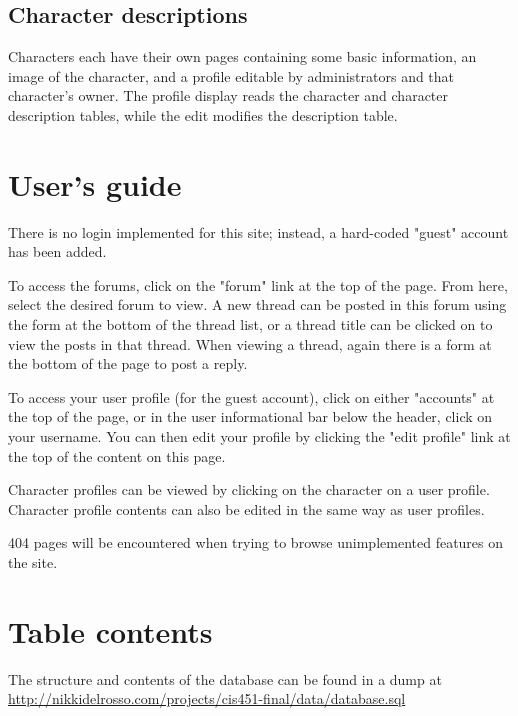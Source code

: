 \documentclass{book}
\begin{document}
\subsection{Character descriptions}
Characters each have their own pages containing some basic information, an image of the character, and a profile editable by administrators and that character's owner.  The profile display reads the character and character description tables, while the edit modifies the description table.


\newpage
\section{User's guide}
There is no login implemented for this site; instead, a hard-coded "guest" account has been added.

To access the forums, click on the "forum" link at the top of the page.  From here, select the desired forum to view.  A new thread can be posted in this forum using the form at the bottom of the thread list, or a thread title can be clicked on to view the posts in that thread.  When viewing a thread, again there is a form at the bottom of the page to post a reply.

To access your user profile (for the guest account), click on either "accounts" at the top of the page, or in the user informational bar below the header, click on your username.  You can then edit your profile by clicking the "edit profile" link at the top of the content on this page.

Character profiles can be viewed by clicking on the character on a user profile.  Character profile contents can also be edited in the same way as user profiles.

404 pages will be encountered when trying to browse unimplemented features on the site.

\section{Table contents}
The structure and contents of the database can be found in a dump at \\ \url{http://nikkidelrosso.com/projects/cis451-final/data/database.sql}
\end{document}

